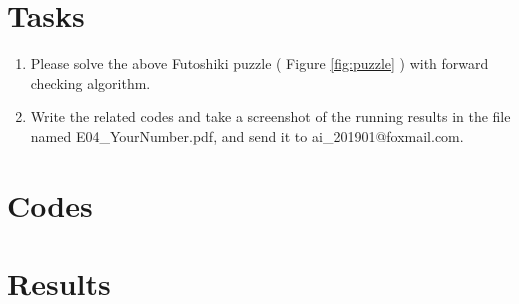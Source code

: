﻿\documentclass[a4paper, 11pt]{article}
\begin{document}
\section{Tasks}


\begin{enumerate}
\item Please solve the above Futoshiki puzzle ( Figure \ref{fig:puzzle} ) with forward checking algorithm.
\item Write the related codes and take a screenshot of the running results in the file named \textsf{E04\_YourNumber.pdf}, and send it to \textsf{ai\_201901@foxmail.com}.

\end{enumerate}
\section{Codes}
\section{Results}


%
%
\end{document}
